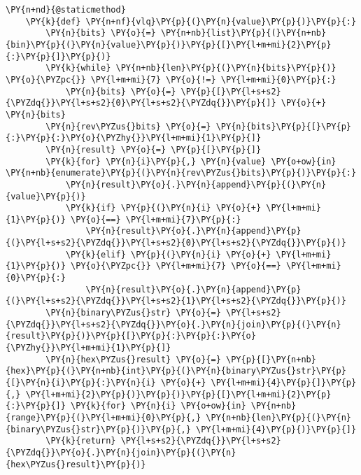 \begin{Verbatim}[commandchars=\\\{\}]
    \PY{n+nd}{@staticmethod}
    \PY{k}{def} \PY{n+nf}{vlq}\PY{p}{(}\PY{n}{value}\PY{p}{)}\PY{p}{:}
        \PY{n}{bits} \PY{o}{=} \PY{n+nb}{list}\PY{p}{(}\PY{n+nb}{bin}\PY{p}{(}\PY{n}{value}\PY{p}{)}\PY{p}{[}\PY{l+m+mi}{2}\PY{p}{:}\PY{p}{]}\PY{p}{)}
        \PY{k}{while} \PY{n+nb}{len}\PY{p}{(}\PY{n}{bits}\PY{p}{)} \PY{o}{\PYZpc{}} \PY{l+m+mi}{7} \PY{o}{!=} \PY{l+m+mi}{0}\PY{p}{:}
            \PY{n}{bits} \PY{o}{=} \PY{p}{[}\PY{l+s+s2}{\PYZdq{}}\PY{l+s+s2}{0}\PY{l+s+s2}{\PYZdq{}}\PY{p}{]} \PY{o}{+} \PY{n}{bits}
        \PY{n}{rev\PYZus{}bits} \PY{o}{=} \PY{n}{bits}\PY{p}{[}\PY{p}{:}\PY{p}{:}\PY{o}{\PYZhy{}}\PY{l+m+mi}{1}\PY{p}{]}
        \PY{n}{result} \PY{o}{=} \PY{p}{[}\PY{p}{]}
        \PY{k}{for} \PY{n}{i}\PY{p}{,} \PY{n}{value} \PY{o+ow}{in} \PY{n+nb}{enumerate}\PY{p}{(}\PY{n}{rev\PYZus{}bits}\PY{p}{)}\PY{p}{:}
            \PY{n}{result}\PY{o}{.}\PY{n}{append}\PY{p}{(}\PY{n}{value}\PY{p}{)}
            \PY{k}{if} \PY{p}{(}\PY{n}{i} \PY{o}{+} \PY{l+m+mi}{1}\PY{p}{)} \PY{o}{==} \PY{l+m+mi}{7}\PY{p}{:}
                \PY{n}{result}\PY{o}{.}\PY{n}{append}\PY{p}{(}\PY{l+s+s2}{\PYZdq{}}\PY{l+s+s2}{0}\PY{l+s+s2}{\PYZdq{}}\PY{p}{)}
            \PY{k}{elif} \PY{p}{(}\PY{n}{i} \PY{o}{+} \PY{l+m+mi}{1}\PY{p}{)} \PY{o}{\PYZpc{}} \PY{l+m+mi}{7} \PY{o}{==} \PY{l+m+mi}{0}\PY{p}{:}
                \PY{n}{result}\PY{o}{.}\PY{n}{append}\PY{p}{(}\PY{l+s+s2}{\PYZdq{}}\PY{l+s+s2}{1}\PY{l+s+s2}{\PYZdq{}}\PY{p}{)}
        \PY{n}{binary\PYZus{}str} \PY{o}{=} \PY{l+s+s2}{\PYZdq{}}\PY{l+s+s2}{\PYZdq{}}\PY{o}{.}\PY{n}{join}\PY{p}{(}\PY{n}{result}\PY{p}{)}\PY{p}{[}\PY{p}{:}\PY{p}{:}\PY{o}{\PYZhy{}}\PY{l+m+mi}{1}\PY{p}{]}
        \PY{n}{hex\PYZus{}result} \PY{o}{=} \PY{p}{[}\PY{n+nb}{hex}\PY{p}{(}\PY{n+nb}{int}\PY{p}{(}\PY{n}{binary\PYZus{}str}\PY{p}{[}\PY{n}{i}\PY{p}{:}\PY{n}{i} \PY{o}{+} \PY{l+m+mi}{4}\PY{p}{]}\PY{p}{,} \PY{l+m+mi}{2}\PY{p}{)}\PY{p}{)}\PY{p}{[}\PY{l+m+mi}{2}\PY{p}{:}\PY{p}{]} \PY{k}{for} \PY{n}{i} \PY{o+ow}{in} \PY{n+nb}{range}\PY{p}{(}\PY{l+m+mi}{0}\PY{p}{,} \PY{n+nb}{len}\PY{p}{(}\PY{n}{binary\PYZus{}str}\PY{p}{)}\PY{p}{,} \PY{l+m+mi}{4}\PY{p}{)}\PY{p}{]}
        \PY{k}{return} \PY{l+s+s2}{\PYZdq{}}\PY{l+s+s2}{\PYZdq{}}\PY{o}{.}\PY{n}{join}\PY{p}{(}\PY{n}{hex\PYZus{}result}\PY{p}{)}
\end{Verbatim}

